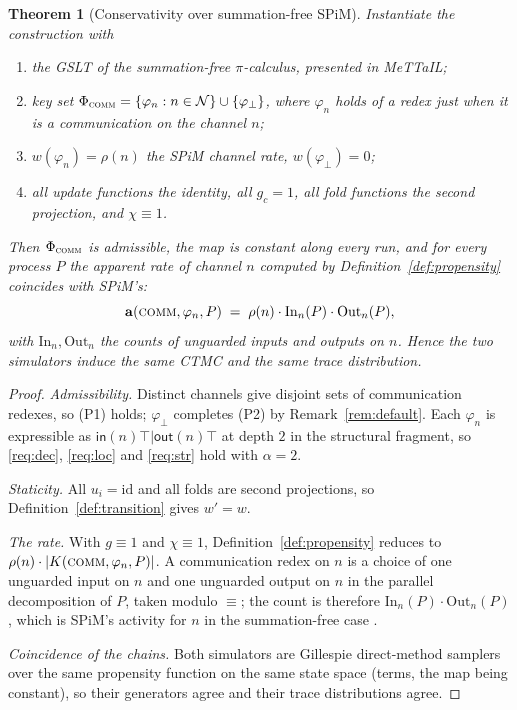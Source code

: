 \documentclass[11pt,a4paper]{article}
\theoremstyle{plain}
\newtheorem{theorem}{Theorem}
\theoremstyle{definition}
\theoremstyle{remark}
\newcommand{\sepc}{\mathbin{\big|}}
\newcommand{\out}{\mathsf{out}}
\newcommand{\inn}{\mathsf{in}}
\newcommand{\prop}{\mathbf{a}}
\newcommand{\wmap}{w}
\newcommand{\gfac}{g}
\begin{document}
\begin{theorem}[Conservativity over summation-free SPiM]
\label{thm:spim}
Instantiate the construction with
\begin{enumerate}[label=(\alph*),leftmargin=2.2em]
\item the GSLT of the \emph{summation-free} $\pi$-calculus, presented in MeTTaIL;
\item key set $\Phi_{\textsc{comm}} = \{\varphi_n : n \in \mathcal{N}\} \cup \{\varphi_\bot\}$, where
$\varphi_n$ holds of a redex just when it is a communication on the channel $n$;
\item $\wmap(\varphi_n) = \rho(n)$ the SPiM channel rate, $\wmap(\varphi_\bot) = 0$;
\item all update functions the identity, all $\gfac_c = 1$, all fold functions the second projection,
and $\chi \equiv 1$.
\end{enumerate}
Then $\Phi_{\textsc{comm}}$ is admissible, the map is constant along every run, and for every process
$P$ the apparent rate of channel $n$ computed by Definition~\ref{def:propensity} coincides with
SPiM's:
\[
\prop(\textsc{comm}, \varphi_n, P) \;=\; \rho(n)\cdot \mathrm{In}_n(P)\cdot \mathrm{Out}_n(P),
\]
with $\mathrm{In}_n, \mathrm{Out}_n$ the counts of unguarded inputs and outputs on $n$. Hence the
two simulators induce the same CTMC and the same trace distribution.
\end{theorem}

\begin{proof}
\emph{Admissibility.} Distinct channels give disjoint sets of communication redexes, so (P1) holds;
$\varphi_\bot$ completes (P2) by Remark~\ref{rem:default}. Each $\varphi_n$ is expressible as
$\inn(n)\top \sepc \out(n)\top$ at depth $2$ in the structural fragment, so \ref{req:dec},
\ref{req:loc} and \ref{req:str} hold with $\alpha = 2$.

\emph{Staticity.} All $u_i = \mathrm{id}$ and all folds are second projections, so
Definition~\ref{def:transition} gives $\wmap' = \wmap$.

\emph{The rate.} With $\gfac \equiv 1$ and $\chi \equiv 1$,
Definition~\ref{def:propensity} reduces to $\rho(n)\cdot|K(\textsc{comm},\varphi_n,P)|$. A
communication redex on $n$ is a choice of one unguarded input on $n$ and one unguarded output on $n$
in the parallel decomposition of $P$, taken modulo $\equiv$; the count is therefore
$\mathrm{In}_n(P)\cdot\mathrm{Out}_n(P)$, which is SPiM's activity for $n$ in the summation-free case
\cite{spim-sim}.

\emph{Coincidence of the chains.} Both simulators are Gillespie direct-method samplers over the same
propensity function on the same state space (terms, the map being constant), so their generators
agree and their trace distributions agree.
\end{proof}
\end{document}
